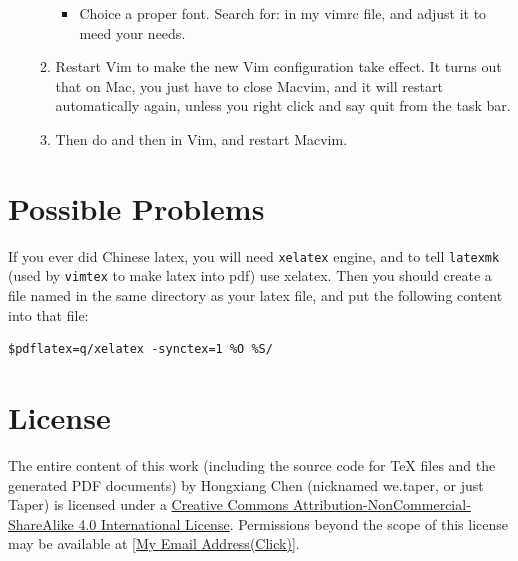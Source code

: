 \documentclass{article}
\begin{document}
\begin{enumerate}
\begin{enumerate}
\begin{itemize}
                    \item Choice a proper font. Search for:  in my vimrc file, and
                        adjust it to meed your needs.
                \end{itemize}

            \item Restart Vim to make the new Vim configuration take
                effect. It turns out that on Mac, you just have to
                close Macvim, and it will restart automatically again,
                unless you right click and say quit from the task bar.

            \item Then do  and then
                 in Vim, and restart Macvim. 

        \end{enumerate}
        
\end{enumerate}

\section{Possible Problems}
\label{sec:Possible Problems}

If you ever did Chinese latex, you will need \texttt{xelatex} engine,
and to tell \texttt{latexmk} (used by \texttt{vimtex} to make latex into
pdf) use xelatex. Then you should create a file named
 in the same directory as your latex file, and put the following content into
that file:
\begin{verbatim}
$pdflatex=q/xelatex -synctex=1 %O %S/
\end{verbatim}

\printnomenclature
\section{License}
The entire content of this work (including the source code
for TeX files and the generated PDF documents) by 
Hongxiang Chen (nicknamed we.taper, or just Taper) is
licensed under a 
\href{http://creativecommons.org/licenses/by-nc-sa/4.0/}{Creative 
Commons Attribution-NonCommercial-ShareAlike 4.0 International 
License}. Permissions beyond the scope of this 
license may be available at 
\href{http://www.google.com/recaptcha/mailhide/d?k=015LguzBJigi0rpyuJRqLoig==\&c=p1c-M-mm7ZcjUCkTuZZa9eEPHRVk6paN0694iazlQy8=}
{[My Email Address(Click)]}.
\end{document}
